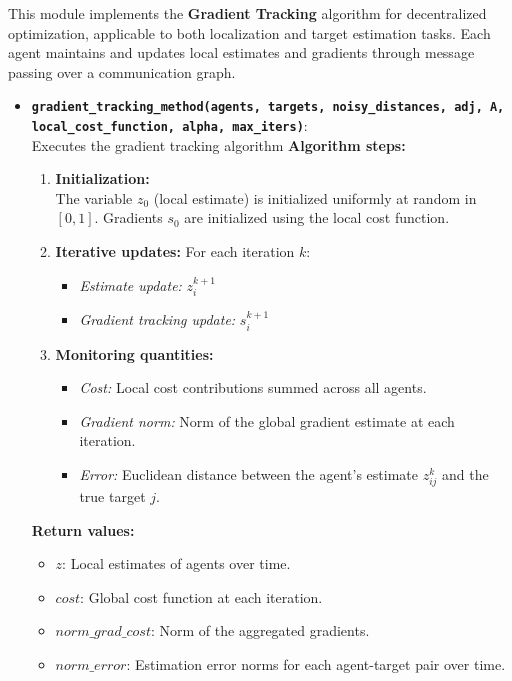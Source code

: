 This module implements the \textbf{Gradient Tracking} algorithm for decentralized optimization, applicable to both localization and target estimation tasks. 
Each agent maintains and updates local estimates and gradients through message passing over a communication graph.

\begin{itemize}
\item \textbf{\texttt{gradient\_tracking\_method(agents, targets, noisy\_distances, adj, A, local\_cost\_function, alpha, max\_iters)}}:\\[2pt]
Executes the gradient tracking algorithm 
    \noindent \textbf{Algorithm steps:}
    \begin{enumerate}
        \item \textbf{Initialization:} \\
        The variable $z_0$ (local estimate) is initialized uniformly at random in $[0,1]$. Gradients $s_0$ are initialized using the local cost function.
        
        \item \textbf{Iterative updates:} For each iteration $k$:
        \begin{itemize}
            \item \emph{Estimate update:} $z^{k+1}_i$
            \item \emph{Gradient tracking update:} $s^{k+1}_i$
        \end{itemize}
        \item \textbf{Monitoring quantities:}
        \begin{itemize}
            \item \emph{Cost:} Local cost contributions summed across all agents.
            \item \emph{Gradient norm:} Norm of the global gradient estimate at each iteration.
            \item \emph{Error:} Euclidean distance between the agent's estimate $z^k_{ij}$ and the true target $j$.
        \end{itemize}
    \end{enumerate}

    \noindent \textbf{Return values:}
    \begin{itemize}
        \item $z$: Local estimates of agents over time.
        \item $cost$: Global cost function at each iteration.
        \item $norm\_grad\_cost$: Norm of the aggregated gradients.
        \item $norm\_error$: Estimation error norms for each agent-target pair over time.
    \end{itemize}
\end{itemize}

